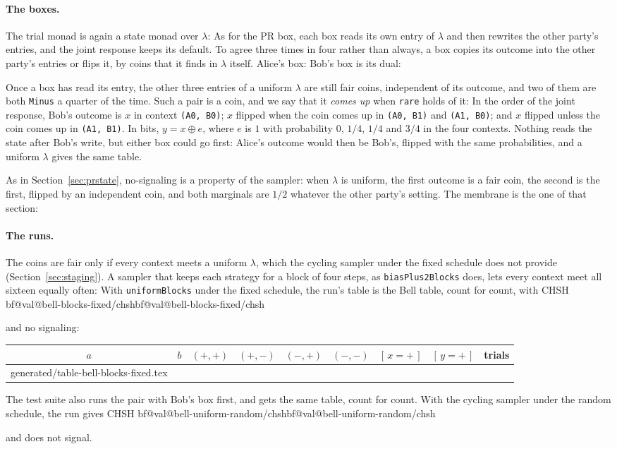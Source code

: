 \documentclass[11pt]{article}
\makeatletter
\newcommand{\hs}{\lstinline[style=hask,basicstyle=\ttfamily,frame=none]}
\newcommand{\val}[1]{\ifcsname bf@val@#1\endcsname\csname bf@val@#1\endcsname
  \else\PackageError{paper}{No value #1 in generated/values.tex}{}\fi}
\newcommand{\tablerows}[1]{\@@input #1 }
\newcommand{\fr}[1]{[\,#1\,]}
\newcommand{\xp}{x{=}{+}}
\newcommand{\yp}{y{=}{+}}
\newcommand{\runtable}[1]{{\small\renewcommand{\arraystretch}{1.12}%
  \begin{tabular}{@{}cc|cccc|ccr@{}}
  $a$ & $b$ & $(+,+)$ & $(+,-)$ & $(-,+)$ & $(-,-)$ & $\fr{\xp}$ & $\fr{\yp}$ & trials\\ \hline
  \tablerows{generated/table-#1.tex}
  \end{tabular}}}
\makeatother
\begin{document}
\paragraph{The boxes.} The trial monad is again a state monad over $\lambda$:
As for the PR box, each box reads its own entry of $\lambda$ and then rewrites the other party's entries, and the joint response keeps its default. To agree three times in four rather than always, a box copies its outcome into the other party's entries or flips it, by coins that it finds in $\lambda$ itself. Alice's box:
Bob's box is its dual:\par\nopagebreak
{}
Once a box has read its entry, the other three entries of a uniform $\lambda$ are still fair coins, independent of its outcome, and two of them are both \hs|Minus| a quarter of the time. Such a pair is a coin, and we say that it \emph{comes up} when \hs|rare| holds of it:
In the order of the joint response, Bob's outcome is $x$ in context \hs|(A0, B0)|; $x$ flipped when the coin comes up in \hs|(A0, B1)| and \hs|(A1, B0)|; and $x$ flipped unless the coin comes up in \hs|(A1, B1)|. In bits, $y = x \oplus e$, where $e$ is $1$ with probability $0$, $1/4$, $1/4$ and $3/4$ in the four contexts. Nothing reads the state after Bob's write, but either box could go first: Alice's outcome would then be Bob's, flipped with the same probabilities, and a uniform $\lambda$ gives the same table.

As in Section~\ref{sec:prstate}, no-signaling is a property of the sampler: when $\lambda$ is uniform, the first outcome is a fair coin, the second is the first, flipped by an independent coin, and both marginals are $1/2$ whatever the other party's setting. The membrane is the one of that section:

\paragraph{The runs.} The coins are fair only if every context meets a uniform $\lambda$, which the cycling sampler under the fixed schedule does not provide (Section~\ref{sec:staging}). A sampler that keeps each strategy for a block of four steps, as \hs|biasPlus2Blocks| does, lets every context meet all sixteen equally often:
With \hs|uniformBlocks| under the fixed schedule, the run's table is the Bell table, count for count, with CHSH \val{bell-blocks-fixed/chsh} and no signaling:
\begin{center}
\runtable{bell-blocks-fixed}
\end{center}
The test suite also runs the pair with Bob's box first, and gets the same table, count for count. With the cycling sampler under the random schedule, the run gives CHSH \val{bell-uniform-random/chsh} and does not signal.
\end{document}
